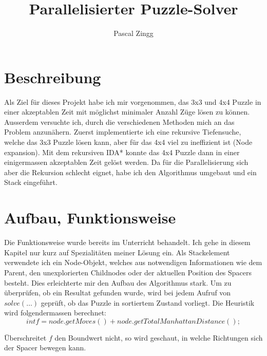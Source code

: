 \documentclass[10pt]{article}         %
\title{Parallelisierter Puzzle-Solver}
\author{Pascal Zingg}
\begin{document}
\maketitle

\section{Beschreibung}
Als Ziel für dieses Projekt habe ich mir vorgenommen, das 3x3 und 4x4 Puzzle in einer akzeptablen Zeit mit möglichst minimaler Anzahl Züge lösen zu können. Ausserdem versuchte ich, durch die verschiedenen Methoden mich an das Problem anzunähern. Zuerst implementierte ich eine rekursive Tiefensuche, welche das 3x3 Puzzle lösen kann, aber für das 4x4 viel zu ineffizient ist (Node expansion). Mit dem rekursiven IDA* konnte das 4x4 Puzzle dann in einer einigermassen akzeptablen Zeit gelöst werden. Da für die Parallelisierung sich aber die Rekursion schlecht eignet, habe ich den Algorithmus umgebaut und ein Stack eingeführt. 

\section{Aufbau, Funktionsweise}
Die Funktionsweise wurde bereits im Unterricht behandelt. Ich gehe in diesem Kapitel nur kurz auf Spezialitäten meiner Lösung ein. Als Stackelement verwendete ich ein Node-Objekt, welches aus notwendigen Informationen wie dem Parent, den unexplorierten Childnodes oder der aktuellen Position des Spacers besteht. Dies erleichterte mir den Aufbau des Algorithmus stark. Um zu überprüfen, ob ein Resultat gefunden wurde, wird bei jedem Aufruf von $solve(\dots)$ geprüft, ob das Puzzle in sortiertem Zustand vorliegt. Die Heuristik wird folgendermassen berechnet:
\[
int f = node.getMoves() + node.getTotalManhattanDistance();
\]

Überschreitet $f$ den Boundwert nicht, so wird geschaut, in welche Richtungen sich der Spacer bewegen kann. 
\end{document}
